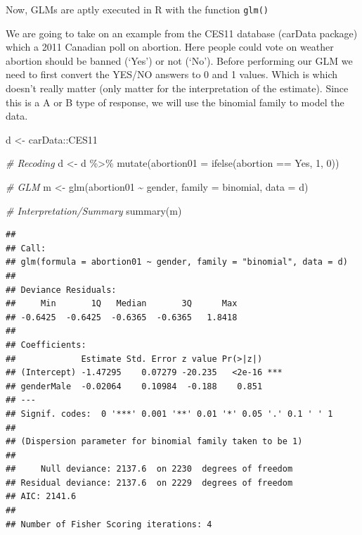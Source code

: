 \documentclass[
]{book}
\newenvironment{Shaded}{\begin{snugshade}}{\end{snugshade}}
\newcommand{\AttributeTok}[1]{\textcolor[rgb]{0.77,0.63,0.00}{#1}}
\newcommand{\CommentTok}[1]{\textcolor[rgb]{0.56,0.35,0.01}{\textit{#1}}}
\newcommand{\DecValTok}[1]{\textcolor[rgb]{0.00,0.00,0.81}{#1}}
\newcommand{\FunctionTok}[1]{\textcolor[rgb]{0.00,0.00,0.00}{#1}}
\newcommand{\NormalTok}[1]{#1}
\newcommand{\OtherTok}[1]{\textcolor[rgb]{0.56,0.35,0.01}{#1}}
\newcommand{\SpecialCharTok}[1]{\textcolor[rgb]{0.00,0.00,0.00}{#1}}
\newcommand{\StringTok}[1]{\textcolor[rgb]{0.31,0.60,0.02}{#1}}
\begin{document}
Now, GLMs are aptly executed in R with the function \texttt{glm()}

We are going to take on an example from the CES11 database (carData package) which a 2011 Canadian poll on abortion. Here people could vote on weather abortion should be banned (`Yes') or not (`No').
Before performing our GLM we need to first convert the YES/NO answers to 0 and 1 values. Which is which doesn't really matter (only matter for the interpretation of the estimate). Since this is a A or B type of response, we will use the binomial family to model the data.

\begin{Shaded}
\begin{Highlighting}[]
\NormalTok{d }\OtherTok{\textless{}{-}}\NormalTok{ carData}\SpecialCharTok{::}\NormalTok{CES11}

\CommentTok{\# Recoding}
\NormalTok{d }\OtherTok{\textless{}{-}}\NormalTok{ d }\SpecialCharTok{\%\textgreater{}\%} 
  \FunctionTok{mutate}\NormalTok{(}\AttributeTok{abortion01 =} \FunctionTok{ifelse}\NormalTok{(abortion }\SpecialCharTok{==} \StringTok{\textquotesingle{}Yes\textquotesingle{}}\NormalTok{, }\DecValTok{1}\NormalTok{, }\DecValTok{0}\NormalTok{))}

\CommentTok{\# GLM}
\NormalTok{m }\OtherTok{\textless{}{-}} \FunctionTok{glm}\NormalTok{(abortion01 }\SpecialCharTok{\textasciitilde{}}\NormalTok{ gender, }\AttributeTok{family =} \StringTok{\textquotesingle{}binomial\textquotesingle{}}\NormalTok{, }\AttributeTok{data =}\NormalTok{ d)}

\CommentTok{\# Interpretation/Summary}
\FunctionTok{summary}\NormalTok{(m)}
\end{Highlighting}
\end{Shaded}

\begin{verbatim}
## 
## Call:
## glm(formula = abortion01 ~ gender, family = "binomial", data = d)
## 
## Deviance Residuals: 
##     Min       1Q   Median       3Q      Max  
## -0.6425  -0.6425  -0.6365  -0.6365   1.8418  
## 
## Coefficients:
##             Estimate Std. Error z value Pr(>|z|)    
## (Intercept) -1.47295    0.07279 -20.235   <2e-16 ***
## genderMale  -0.02064    0.10984  -0.188    0.851    
## ---
## Signif. codes:  0 '***' 0.001 '**' 0.01 '*' 0.05 '.' 0.1 ' ' 1
## 
## (Dispersion parameter for binomial family taken to be 1)
## 
##     Null deviance: 2137.6  on 2230  degrees of freedom
## Residual deviance: 2137.6  on 2229  degrees of freedom
## AIC: 2141.6
## 
## Number of Fisher Scoring iterations: 4
\end{verbatim}
\end{document}
